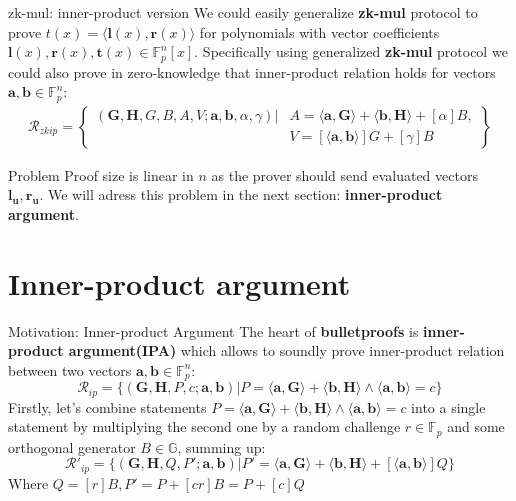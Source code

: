 \documentclass{zkdl-presentation-template}
\begin{document}
\begin{frame}{zk-mul: inner-product version}
    We could easily generalize \textbf{zk-mul} protocol to prove $t(x) = \langle \mathbf{l}(x), \mathbf{r}(x) \rangle $ for polynomials with vector coefficients $\mathbf{l}(x), \mathbf{r}(x), \mathbf{t}(x) \in \mathbb{F}_p^n[x]$. Specifically using generalized \textbf{zk-mul} protocol we could also prove in zero-knowledge that inner-product relation holds for vectors $\mathbf{a}, \mathbf{b} \in \mathbb{F}_p^n$:
    \begin{align*}
        \mathcal{R}_{zkip} = \left\{ \begin{aligned} (\mathbf{G,H},G,B,A,V;\mathbf{a,b},\alpha, \gamma) \vert & A = \langle \mathbf{a,G} \rangle + \langle \mathbf{b,H} \rangle + [\alpha] B, \\ & V = [\langle \mathbf{a,b} \rangle]G + [\gamma]B \end{aligned} \right\}
    \end{align*}
    \begin{alertblock}{Problem}
        Proof size is linear in $n$ as the prover should send evaluated vectors $\mathbf{l_u}, \mathbf{r_u}$. We will adress this problem in the next section: \textbf{inner-product argument}.
    \end{alertblock}
\end{frame}

\section{Inner-product argument}

\begin{frame}{Motivation: Inner-product Argument}
    The heart of \textbf{bulletproofs} is \textbf{inner-product argument(IPA)} which allows to soundly prove inner-product relation between two vectors $\mathbf{a}, \mathbf{b} \in \mathbb{F}_p^n$:
    $$\mathcal{R}_{ip} = \{ (\mathbf{G,H}, P, c; \mathbf{a,b}) \vert P = \langle \mathbf{a,G} \rangle + \langle \mathbf{b,H} \rangle \wedge \langle \mathbf{a,b} \rangle = c \}$$
    Firstly, let's combine statements $P = \langle \mathbf{a,G} \rangle + \langle \mathbf{b,H} \rangle \wedge \langle \mathbf{a,b} \rangle = c$ into a single statement by multiplying the second one by a random challenge $r \in \mathbb{F}_p$ and some orthogonal generator $B \in \mathbb{G}$, summing up:
    $$
    \mathcal{R}'_{ip} = \{ (\mathbf{G,H}, Q, P'; \mathbf{a,b}) \vert P' = \langle \mathbf{a,G} \rangle + \langle \mathbf{b,H} \rangle + [\langle \mathbf{a,b} \rangle]Q \}
    $$
    Where $Q=[r]B, P' = P + [cr]B = P+[c]Q$
\end{frame}
\end{document}
